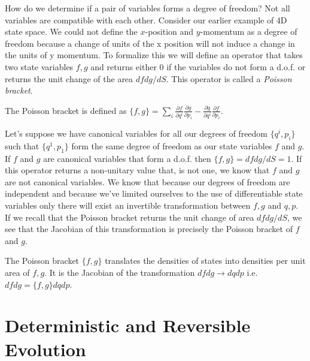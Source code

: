 \documentclass{article}
\begin{document}
	How do we determine if a pair of variables forms a degree of freedom? Not all variables are compatible with each other. Consider our earlier example of 4D state space. We could not define the $x$-position and $y$-momentum as a degree of freedom because a change of units of the x position will not induce a change in the units of y momentum. To formalize this we will define an operator that takes two state variables $f,g$ and returns either 0 if the variables do not form a d.o.f. or returns the unit change of the area $dfdg/dS$. This operator is called a \textit{Poisson bracket}.

\begin{defn}
	The Poisson bracket is defined as $\{f,g\} = \sum_i \frac{\partial f}{\partial q^i}\frac{\partial g}{\partial p_i} - \frac{\partial g}{\partial q^i}\frac{\partial f}{\partial p_i}$.
\end{defn}

	Let's suppose we have canonical variables for all our degrees of freedom $\{q^i,p_i\}$ such that $\{q^1,p_1\}$ form the same degree of freedom as our state variables $f$ and $g$. If $f$ and $g$ are canonical variables that form a d.o.f. then $\{f,g \} = dfdg/dS = 1$. If this operator returns a non-unitary value that, is not one, we know that $f$ and $g$ are not canonical variables. We know that because our degrees of freedom are independent and because we've limited ourselves to the use of differentiable state variables only there will exist an invertible transformation between $f,g$ and $q,p$. If we recall that the Poisson bracket returns the unit change of area $dfdg/dS$, we see that the Jacobian of this transformation is precisely the Poisson bracket of $f$ and $g$.

\begin{prop}
	The Poisson bracket $\{f, g\}$ translates the densities of states into densities per unit area of $f, g$. It is the Jacobian of the transformation $dfdg \rightarrow dqdp$ i.e. $dfdg = \{f,g\}dqdp$.
\end{prop}
	
\section{Deterministic and Reversible Evolution}
\end{document}
